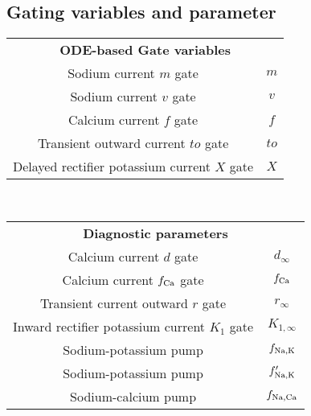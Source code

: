 \documentclass{scrartcl}
\begin{document}
\subsection{Gating variables and parameter}
\begin{table}[ht]
\centering
\begin{tabular}{cc}
\multicolumn{2}{c}{\bf ODE-based Gate variables}\\
Sodium current $m$ gate & $m$ \\
Sodium current $v$ gate & $v$ \\
Calcium current $f$ gate & $f$ \\
Transient outward current $to$ gate & $to$ \\
Delayed rectifier potassium current $X$ gate & $X$ 
\end{tabular}\\[1em]
%
\begin{tabular}{cc}
\multicolumn{2}{c}{\bf Diagnostic parameters}\\
Calcium current $d$ gate & $d_{\infty}$\\
Calcium current $f_{\rm Ca}$ gate & $f_{\rm Ca}$ \\
Transient current outward $r$ gate & $r_{\infty}$ \\
Inward rectifier potassium current $K_1$ gate & $K_{1, \infty}$ \\
Sodium-potassium pump & $f_{\rm Na, K}$ \\
Sodium-potassium pump & $f_{\rm Na, K}'$ \\
Sodium-calcium pump & $f_{\rm Na, Ca}$
\end{tabular}
\end{table}
%
%
\end{document}
